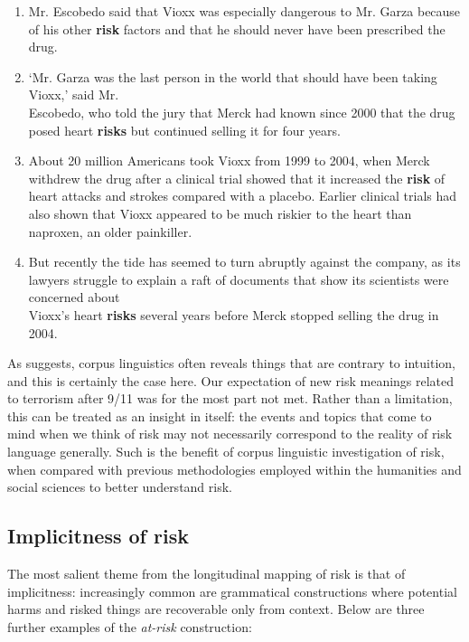 \begin{enumerate}  [before=\color{black}\ttfamily] \setlength\itemsep{0em} \small
\item Mr. Escobedo said that Vioxx was especially dangerous to Mr. Garza because of his other \textbf{risk} factors and that he should never have been prescribed the drug.
\item `Mr. Garza was the last person in the world that should have been taking Vioxx,' said Mr. \\ Escobedo, who told the jury that Merck had known since 2000 that the drug posed heart \textbf{risks} but continued selling it for four years.
\item About 20 million Americans took Vioxx from 1999 to 2004, when Merck withdrew the drug after a clinical trial showed that it increased the \textbf{risk} of heart attacks and strokes compared with a placebo. Earlier clinical trials had also shown that Vioxx appeared to be much riskier to the heart than naproxen, an older painkiller.
\item But recently the tide has seemed to turn abruptly against the company, as its lawyers struggle to explain a raft of documents that show its scientists were concerned about \\ Vioxx's heart \textbf{risks} several years before Merck stopped selling the drug in 2004. 
\end{enumerate}
%
As  suggests, corpus linguistics often reveals things that are contrary to intuition, and this is certainly the case here. Our expectation of new risk meanings related to terrorism after 9\slash 11 was for the most part not met. Rather than a limitation, this can be treated as an insight in itself: the events and topics that come to mind when we think of risk may not necessarily correspond to the reality of risk language generally. Such is the benefit of corpus linguistic investigation of risk, when compared with previous methodologies employed within the humanities and social sciences to better understand risk.

\subsection{Implicitness of risk}

The most salient theme from the longitudinal mapping of risk is that of implicitness: increasingly common are grammatical constructions where potential harms and risked things are recoverable only from context. Below are three further examples of the \emph{at-risk} construction:

